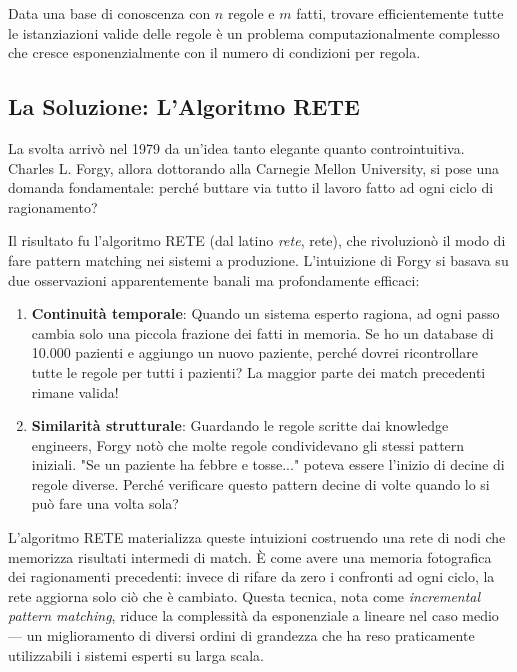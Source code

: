\begin{infobox}
Data una base di conoscenza con $n$ regole e $m$ fatti, trovare efficientemente tutte le istanziazioni valide delle regole è un problema computazionalmente complesso che cresce esponenzialmente con il numero di condizioni per regola.
\end{infobox}

\subsection{La Soluzione: L'Algoritmo RETE}

La svolta arrivò nel 1979 da un'idea tanto elegante quanto controintuitiva. Charles L. Forgy, allora dottorando alla Carnegie Mellon University, si pose una domanda fondamentale: perché buttare via tutto il lavoro fatto ad ogni ciclo di ragionamento? 

Il risultato fu l'algoritmo RETE (dal latino \textit{rete}, rete), che rivoluzionò il modo di fare pattern matching nei sistemi a produzione. L'intuizione di Forgy si basava su due osservazioni apparentemente banali ma profondamente efficaci:

\begin{enumerate}
\item \textbf{Continuità temporale}: Quando un sistema esperto ragiona, ad ogni passo cambia solo una piccola frazione dei fatti in memoria. Se ho un database di 10.000 pazienti e aggiungo un nuovo paziente, perché dovrei ricontrollare tutte le regole per tutti i pazienti? La maggior parte dei match precedenti rimane valida!

\item \textbf{Similarità strutturale}: Guardando le regole scritte dai knowledge engineers, Forgy notò che molte regole condividevano gli stessi pattern iniziali. "Se un paziente ha febbre e tosse..." poteva essere l'inizio di decine di regole diverse. Perché verificare questo pattern decine di volte quando lo si può fare una volta sola?
\end{enumerate}

L'algoritmo RETE materializza queste intuizioni costruendo una rete di nodi che memorizza risultati intermedi di match. È come avere una memoria fotografica dei ragionamenti precedenti: invece di rifare da zero i confronti ad ogni ciclo, la rete aggiorna solo ciò che è cambiato. Questa tecnica, nota come \textit{incremental pattern matching}, riduce la complessità da esponenziale a lineare nel caso medio — un miglioramento di diversi ordini di grandezza che ha reso praticamente utilizzabili i sistemi esperti su larga scala.

